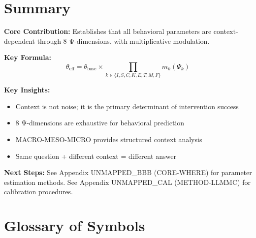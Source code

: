 \section{Summary}
\label{sec:when-summary}

\begin{tcolorbox}[colback=gray!5!white, colframe=gray!75!black,
    title=Appendix UNMAPPED_V Summary: CORE-WHEN]

\textbf{Core Contribution:}
Establishes that all behavioral parameters are context-dependent through
8 Ψ-dimensions, with multiplicative modulation.

\textbf{Key Formula:}
\begin{equation}
\theta_{\text{eff}} = \theta_{\text{base}} \times \prod_{k \in \{I,S,C,K,E,T,M,F\}} m_k(\Psi_k)
\end{equation}

\textbf{Key Insights:}
\begin{itemize}[nosep]
\item Context is not noise; it is the primary determinant of intervention success
\item 8 Ψ-dimensions are exhaustive for behavioral prediction
\item MACRO-MESO-MICRO provides structured context analysis
\item Same question + different context = different answer
\end{itemize}

\textbf{Next Steps:}
See Appendix UNMAPPED_BBB (CORE-WHERE) for parameter estimation methods.
See Appendix UNMAPPED_CAL (METHOD-LLMMC) for calibration procedures.

\end{tcolorbox}


\section{Glossary of Symbols}
\label{sec:when-glossary}

